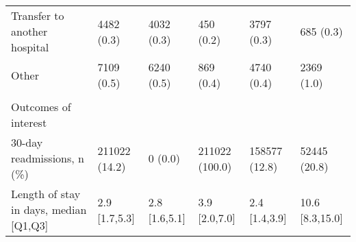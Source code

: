 \begin{adjustbox}{width={\textwidth},totalheight={\textheight},keepaspectratio,frame,padding=0ex 0ex -910ex 0ex}
{\begin{tabular}{L{20em}C{10em}C{10em}C{10em}C{10em}C{10em}}
\hspace{3mm} Transfer to another hospital & 4482 (0.3) & 4032 (0.3) & 450 (0.2) & 3797 (0.3) & 685 (0.3)\\
\hspace{3mm} Other & 7109 (0.5) & 6240 (0.5) & 869 (0.4) & 4740 (0.4) & 2369 (1.0)\\
&  &  &  &  & \\
Outcomes of interest &  &  &  &  &  \\
\hspace{3mm} 30-day readmissions, n (\%)  & 211022 (14.2) & 0 (0.0) & 211022 (100.0) & 158577 (12.8) & 52445 (20.8)\\
\hspace{3mm} Length of stay in days, median [Q1,Q3] & 2.9 [1.7,5.3] & 2.8 [1.6,5.1] & 3.9 [2.0,7.0] & 2.4 [1.4,3.9] & 10.6 [8.3,15.0]\\
\end{tabular}
\label{table:table1}
}
\end{adjustbox}
